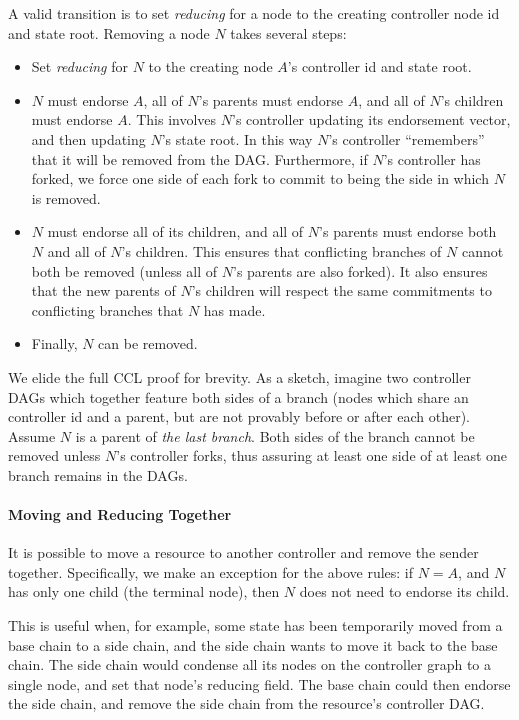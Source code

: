 \documentclass[a4paper,USenglish,cleveref, autoref, thm-restate, anonymous]{lipics-v2021}
\begin{document}
A valid transition is to set \textit{reducing} for a node to the creating controller node id and state root. 
Removing a node $N$ takes several steps:
\begin{itemize}
    \item Set \textit{reducing} for $N$ to the creating node $A$'s  controller id and state root.
    \item $N$ must endorse $A$, all of $N$'s parents must endorse $A$, and all of $N$'s children must endorse $A$.
          This involves $N$'s controller updating its endorsement vector, and then updating $N$'s state root.
          In this way $N$'s controller ``remembers'' that it will be removed from the DAG.
          Furthermore, if $N$'s controller has forked, we force one side of each fork to commit to being the side in which $N$ is removed.
    \item $N$ must endorse all of its children, and all of $N$'s parents must endorse both $N$ and all of $N$'s children.
          This ensures that conflicting branches of $N$ cannot both be removed (unless all of $N$'s parents are also forked).
          It also ensures that the new parents of $N$'s children will respect the same commitments to conflicting branches that $N$ has made. 
    \item Finally, $N$ can be removed.
\end{itemize}

We elide the full CCL proof for brevity. 
As a sketch, imagine two controller DAGs which together feature both sides of a branch (nodes which share an controller id and a parent, but are not provably before or after each other).
Assume $N$ is a parent of \textit{the last branch}.
Both sides of the branch cannot be removed unless $N$'s controller forks, thus assuring at least one side of at least one branch remains in the DAGs. 

\paragraph{Moving and Reducing Together}
It is possible to move a resource to another controller and remove the sender together. 
Specifically, we make an exception for the above rules: if $N=A$, and $N$ has only one child (the terminal node), then $N$ does not need to endorse its child. 

This is useful when, for example, some state has been temporarily moved from a base chain to a side chain, and the side chain wants to move it back to the base chain.
The side chain would condense all its nodes on the controller graph to a single node, and set that node's reducing field. 
The base chain could then endorse the side chain, and remove the side chain from the resource's controller DAG. 
\end{document}
